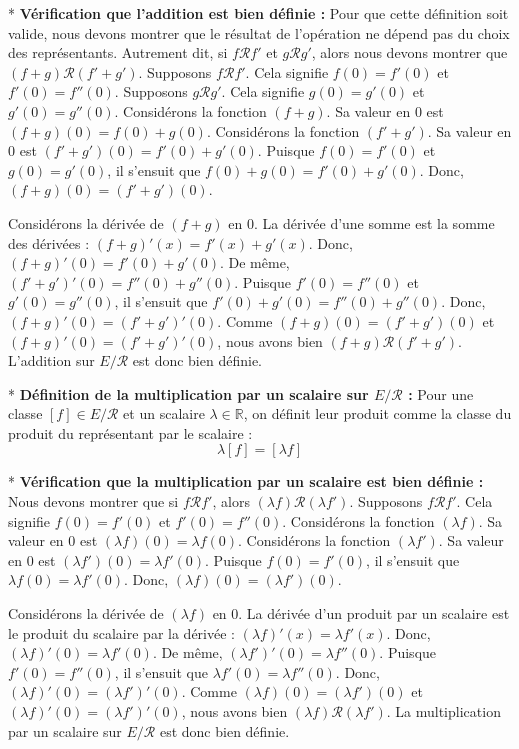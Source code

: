 \documentclass{report}
\begin{document}
*   \textbf{Vérification que l'addition est bien définie :}
    Pour que cette définition soit valide, nous devons montrer que le résultat de l'opération ne dépend pas du choix des représentants. Autrement dit, si $f \mathcal{R} f'$ et $g \mathcal{R} g'$, alors nous devons montrer que $(f+g) \mathcal{R} (f'+g')$.
    Supposons $f \mathcal{R} f'$. Cela signifie $f(0) = f'(0)$ et $f'(0) = f''(0)$.
    Supposons $g \mathcal{R} g'$. Cela signifie $g(0) = g'(0)$ et $g'(0) = g''(0)$.
    Considérons la fonction $(f+g)$. Sa valeur en $0$ est $(f+g)(0) = f(0) + g(0)$.
    Considérons la fonction $(f'+g')$. Sa valeur en $0$ est $(f'+g')(0) = f'(0) + g'(0)$.
    Puisque $f(0) = f'(0)$ et $g(0) = g'(0)$, il s'ensuit que $f(0) + g(0) = f'(0) + g'(0)$.
    Donc, $(f+g)(0) = (f'+g')(0)$.

    Considérons la dérivée de $(f+g)$ en $0$. La dérivée d'une somme est la somme des dérivées : $(f+g)'(x) = f'(x) + g'(x)$.
    Donc, $(f+g)'(0) = f'(0) + g'(0)$.
    De même, $(f'+g')'(0) = f''(0) + g''(0)$.
    Puisque $f'(0) = f''(0)$ et $g'(0) = g''(0)$, il s'ensuit que $f'(0) + g'(0) = f''(0) + g''(0)$.
    Donc, $(f+g)'(0) = (f'+g')'(0)$.
    Comme $(f+g)(0) = (f'+g')(0)$ et $(f+g)'(0) = (f'+g')'(0)$, nous avons bien $(f+g) \mathcal{R} (f'+g')$.
    L'addition sur $E/\mathcal{R}$ est donc bien définie.

*   \textbf{Définition de la multiplication par un scalaire sur $E/\mathcal{R}$ :}
    Pour une classe $[f] \in E/\mathcal{R}$ et un scalaire $\lambda \in \mathbb{R}$, on définit leur produit comme la classe du produit du représentant par le scalaire :
    $$\lambda [f] = [\lambda f]$$

*   \textbf{Vérification que la multiplication par un scalaire est bien définie :}
    Nous devons montrer que si $f \mathcal{R} f'$, alors $(\lambda f) \mathcal{R} (\lambda f')$.
    Supposons $f \mathcal{R} f'$. Cela signifie $f(0) = f'(0)$ et $f'(0) = f''(0)$.
    Considérons la fonction $(\lambda f)$. Sa valeur en $0$ est $(\lambda f)(0) = \lambda f(0)$.
    Considérons la fonction $(\lambda f')$. Sa valeur en $0$ est $(\lambda f')(0) = \lambda f'(0)$.
    Puisque $f(0) = f'(0)$, il s'ensuit que $\lambda f(0) = \lambda f'(0)$.
    Donc, $(\lambda f)(0) = (\lambda f')(0)$.

    Considérons la dérivée de $(\lambda f)$ en $0$. La dérivée d'un produit par un scalaire est le produit du scalaire par la dérivée : $(\lambda f)'(x) = \lambda f'(x)$.
    Donc, $(\lambda f)'(0) = \lambda f'(0)$.
    De même, $(\lambda f')'(0) = \lambda f''(0)$.
    Puisque $f'(0) = f''(0)$, il s'ensuit que $\lambda f'(0) = \lambda f''(0)$.
    Donc, $(\lambda f)'(0) = (\lambda f')'(0)$.
    Comme $(\lambda f)(0) = (\lambda f')(0)$ et $(\lambda f)'(0) = (\lambda f')'(0)$, nous avons bien $(\lambda f) \mathcal{R} (\lambda f')$.
    La multiplication par un scalaire sur $E/\mathcal{R}$ est donc bien définie.
\end{document}
